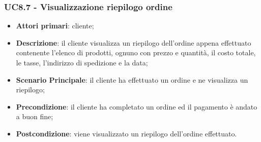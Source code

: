 \subsubsection{UC8.7 - Visualizzazione riepilogo ordine}
\begin{itemize}
\item \textbf{Attori primari}: cliente;
\item \textbf{Descrizione}: il cliente visualizza un riepilogo dell'ordine appena effettuato contenente l'elenco di prodotti, ognuno con prezzo e quantità, il costo totale, le tasse, l'indirizzo di spedizione e la data;
\item \textbf{Scenario Principale}: il cliente ha effettuato un ordine e ne visualizza un riepilogo;
\item \textbf{Precondizione}: il cliente ha completato un ordine ed il pagamento è andato a buon fine;
\item \textbf{Postcondizione}: viene visualizzato un riepilogo dell'ordine effettuato.
\end{itemize}
